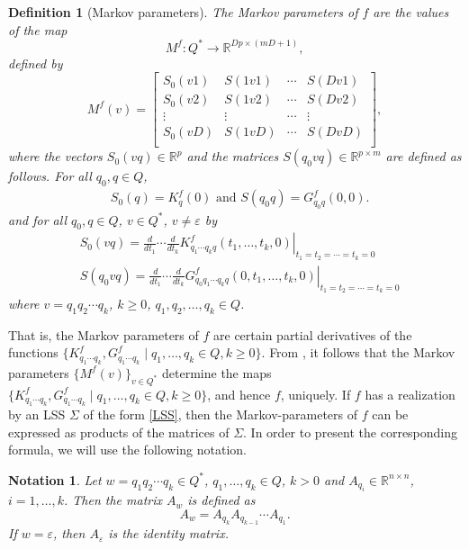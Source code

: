 \documentclass[journal]{IEEEtran}
\newcommand{\QNUM}{D}
\newtheorem{Definition}{Definition}
\newtheorem{Notation}{Notation}
\begin{document}
\begin{Definition}[Markov parameters] \label{MarkovParameters}
	The Markov parameters of $f$ are the values of the map
	\[ M^f:Q^{*} \rightarrow \mathbb{R}^{\QNUM p \times (m\QNUM + 1)}, \]
	defined by
	\[ M^f(v)=\begin{bmatrix}
	S_0(v1) & S(1v1) & \cdots & S(\QNUM v1) \\
	S_0(v2) & S(1v2) & \cdots & S(\QNUM v2) \\
	\vdots  & \vdots   & \cdots & \vdots \\
	S_0(v\QNUM) & S(1v\QNUM) & \cdots & S(\QNUM v \QNUM) \\
	\end{bmatrix}, \]
	where the vectors $S_0(vq) \in \mathbb{R}^p$ and the matrices $S(q_0vq) \in \mathbb{R}^{p \times m}$ are defined as follows. For all $q_0,q \in Q$,
	\begin{align*}
		& S_0(q)= K^f_{q}(0) \mbox{ and }  S(q_0q)= G^f_{q_0q}(0,0).
	\end{align*}
	and for all $q_0,q \in Q$, $v \in Q^*$, $v \neq \varepsilon$ by
	\begin{align*}
		& S_0(vq)= \left. \frac{d}{dt_1} \cdots \frac{d}{dt_k} K^f_{q_1 \cdots q_k q}(t_1, \dots, t_k, 0) \right| _{t_1=t_2= \cdots =t_k=0} \\
		& S(q_0vq)=\left. \frac{d}{dt_1} \cdots \frac{d}{dt_k} G^f_{q_0q_1 \cdots q_k q}(0,t_1, \dots, t_k, 0) \right| _{t_1=t_2= \cdots =t_k=0}
	\end{align*}
	where $v=q_1q_2 \cdots q_k$, $k \geq 0$, $q_1,q_2, \dots, q_k \in Q$.
\end{Definition}

That is, the Markov parameters of $f$ are certain partial derivatives of the functions $\{K^f_{q_1\cdots q_k}, G^f_{q_1\cdots q_k} \mid q_1,\ldots,q_k \in Q, k \ge 0\}$. From \cite{MP:BigArticlePartI}, it follows that the Markov parameters $\{M^f(v)\}_{v \in Q^*}$ determine the maps $\{K^f_{q_1\cdots q_k}, G^f_{q_1\cdots q_k} \mid q_1,\ldots,q_k \in Q, k \ge 0\}$, and hence $f$, uniquely.
If $f$ has a realization by an LSS $\Sigma$ of the form \eqref{LSS}, then the Markov-parameters of $f$ can be expressed as products of the matrices of $\Sigma$. In order to present the corresponding formula, we will use the following notation.

\begin{Notation} \label{Notation2}
	Let $w=q_1q_2 \cdots q_k \in Q^*$, $q_1,\dots,q_k \in Q$, $k>0$ and $A_{q_i} \in \mathbb{R}^{n \times n}$, $i=1,\dots,k$. Then the matrix $A_w$ is defined as
	\begin{equation} 
		A_w=A_{q_k}A_{q_{k-1}}\cdots A_{q_1}.
	\end{equation}
	If $w= \varepsilon$, then $A_\varepsilon$ is the identity matrix.
\end{Notation}
\end{document}
